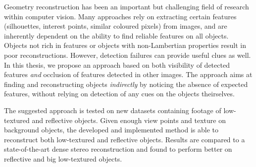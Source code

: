Geometry reconstruction has been an important but challenging field of research within computer vision. Many approaches rely on extracting certain features (silhouettes, interest points, similar coloured pixels) from images, and are inherently dependent on the ability to find reliable features on all objects. Objects not rich in features or objects with non-Lambertian properties result in poor reconstructions. However, detection failures can provide useful clues as well. In this thesis, we propose an approach based on both visibility of detected features \emph{and} occlusion of features detected in other images. The approach aims at finding and reconstructing objects \emph{indirectly} by noticing the absence of expected features, without relying on detection of any cues on the objects theirselves.

The suggested approach is tested on new datasets containing footage of low-textured and reflective objects. Given enough view points and texture on background objects, the developed and implemented method is able to reconstruct both low-textured and reflective objects. Results are compared to a state-of-the-art dense stereo reconstruction and found to perform better on reflective and big low-textured objects. 
